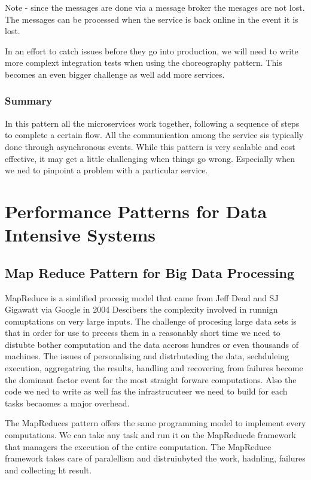 \documentclass[a4paper, 11pt]{book}
\begin{document}
{    Note - since the messages are done via a message broker the mesages are not lost.
    The messages can be processed when the service is back online in the event it is lost.

    In an effort to catch issues before they go into production, we will need to write more complext integration tests when using the choreography pattern.
    This becomes an even bigger challenge as well add more services.

    \subsubsection{Summary}
    In this pattern all the microservices work together, following a sequence of steps to complete a certain flow.
    All the communication among the service sis typically done through asynchronous events.
    While this pattern is very scalable and cost effective, it may get a little challenging when things go wrong.
    Especially when we ned to pinpoint a problem with a particular service.


    \section{Performance Patterns for Data Intensive Systems}

    \subsection{Map Reduce Pattern for Big Data Processing}
    MapReduce is a simlified procesig model that came from Jeff Dead and SJ Gigawatt via Google in 2004
    Descibers the complexity involved in runnign comuptations on very large inputs.
    The challenge of procesing large data sets is that in order for use to precess them in a reasonably short time we need to distubte bother computation and the data accross hundres or even thousands of machines.
    The issues of personalising and distrbuteding the data, sechduleing execution, aggregatring the results, handling and recovering from failures become the dominant factor event for the most straight forware computations.
    Also the code we ned to write as well fas the infrastrucuteer we need to build for each tasks becaomes a major overhead.

    The MapReduces pattern offers the same programming model to implement every computations.
    We can take any task and run it on the MapReducde framework that managers the execution of the entire computation.
    The MapReduce framework takes care of paralellism and distruiubyted the work, hadnling, failures and collecting ht result.

}
\end{document}
